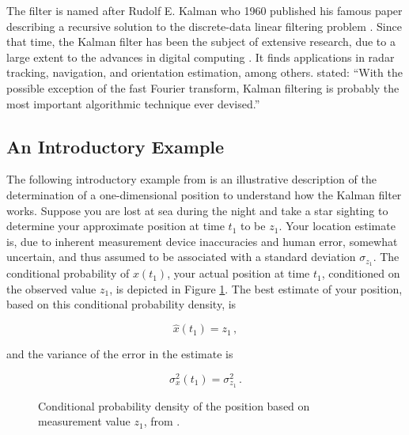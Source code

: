 The filter is named after Rudolf E. Kalman who 1960 published his famous paper describing a recursive solution to the discrete-data linear filtering problem \cite{kalman_1960}. Since that time, the Kalman filter has been the subject of extensive research, due to a large extent to the advances in digital computing \cite{welch2014}. It finds applications in radar tracking, navigation, and orientation estimation, among others. \citeauthor{zarchan2009fundamentals} \cite{zarchan2009fundamentals} stated: ``With the possible exception of the fast Fourier transform, Kalman filtering is probably the most important algorithmic technique ever devised.''

\subsection{An Introductory Example}

The following introductory example from \citeauthor{Maybeck79} \cite{Maybeck79} is an illustrative description of the determination of a one-dimensional position to understand how the Kalman filter works. Suppose you are lost at sea during the night and take a star sighting to determine your approximate position at time $t_1$ to be $z_1$. Your location estimate is, due to inherent measurement device inaccuracies and human error, somewhat uncertain, and thus assumed to be associated with a standard deviation $\sigma_{z_1}$. The conditional probability of $x(t_1)$, your actual position at time $t_1$, conditioned on the observed value $z_1$, is depicted in Figure \ref{fig:measurement_z1}. The best estimate of your position, based on this conditional probability density, is

\begin{equation}
  \hat{x}(t_1)=z_1\,,
\end{equation}

\noindent
and the variance of the error in the estimate is

\begin{equation}
  \sigma^2_x(t_1)=\sigma^2_{z_1}\,.
\end{equation}

\begin{figure}
\centering
{}
\caption{Conditional probability density of the position based on measurement value $z_1$, from \cite{Maybeck79}.} \label{fig:measurement_z1}
\end{figure}

